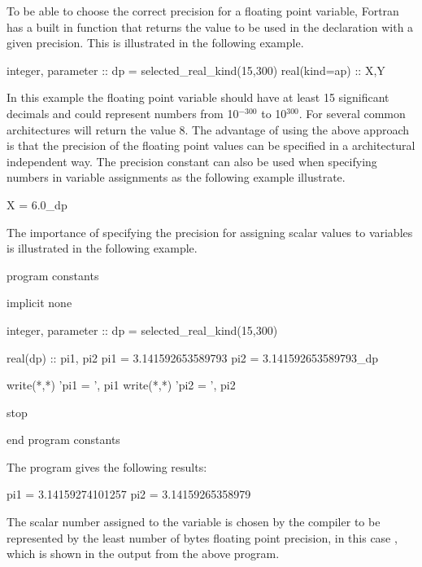 To be able to choose the correct precision for a floating point variable, Fortran has a built in function  that returns the value to be used in the declaration with a given precision. This is illustrated in the following example.

\begin{fortrancodeenv}
integer, parameter :: dp = selected_real_kind(15,300)
real(kind=ap) :: X,Y
\end{fortrancodeenv}

In this example the floating point variable should have at least 15 significant decimals and could represent numbers from 10$^{-300}$ to 10$^{300}$. For several common architectures  will return the value 8. The advantage of using the above approach is that the precision of the floating point values can be specified in a architectural independent way. The precision constant can also be used when
specifying numbers in variable assignments as the following example illustrate.

\begin{fortrancodeenv}
X = 6.0_dp
\end{fortrancodeenv}

The importance of specifying the precision for assigning scalar values to variables is illustrated in the following example.

\begin{fortrancodeenv}
program constants

    implicit none

    integer, parameter :: dp = selected_real_kind(15,300)

    real(dp) :: pi1, pi2
    pi1 = 3.141592653589793
    pi2 = 3.141592653589793_dp

    write(*,*) 'pi1 = ', pi1
    write(*,*) 'pi2 = ', pi2

    stop

end program constants
\end{fortrancodeenv}

The program gives the following results:

\cmdmode

\begin{fortrancodeenv}
pi1 = 3.14159274101257
pi2 = 3.14159265358979
\end{fortrancodeenv}

\fmode

The scalar number assigned to the variable  is chosen by the compiler to be represented by the least number of bytes floating point precision, in this case , which is shown in the output from the above program.

